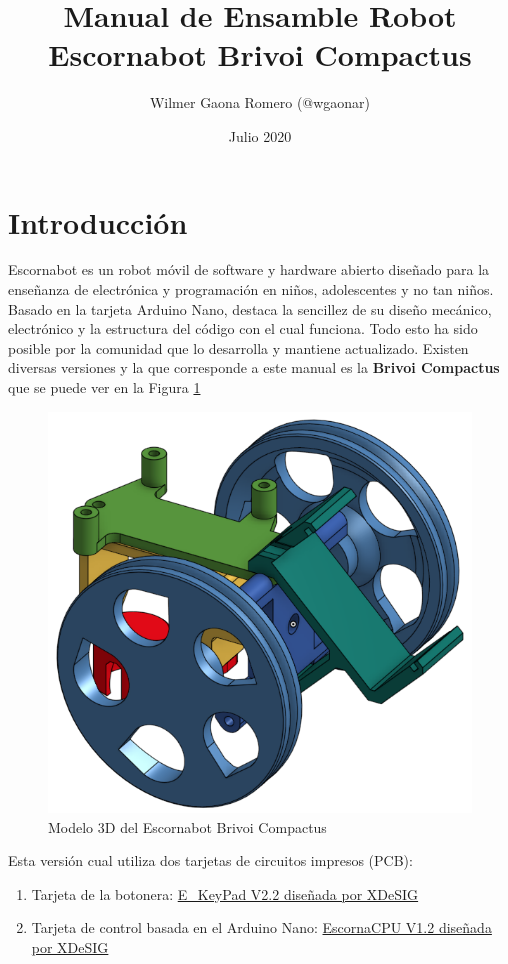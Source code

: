\documentclass{article}
\title{Manual de Ensamble Robot Escornabot Brivoi Compactus}
\author{Wilmer Gaona Romero (@wgaonar)}
\date{Julio 2020}
\begin{document}
\maketitle

\section{Introducción}
Escornabot es un robot móvil de software y hardware abierto diseñado para la enseñanza de electrónica y programación en niños, adolescentes y no tan niños. Basado en la tarjeta Arduino Nano, destaca la sencillez de su diseño mecánico, electrónico y la estructura del código con el cual funciona. Todo esto ha sido posible por la comunidad que lo desarrolla y mantiene actualizado. Existen diversas versiones y la que corresponde a este manual es la \textbf{Brivoi Compactus} que se puede ver en la Figura \ref{fig:modelo3D}

\begin{figure}[H]
    \centering
    \includegraphics[width=0.5\columnwidth]{images/3DParts/portadaOnshape.png}
    \caption{Modelo 3D del Escornabot Brivoi Compactus}
    \label{fig:modelo3D}
\end{figure}

Esta versión cual utiliza dos tarjetas de circuitos impresos (PCB):

\begin{enumerate}
    \item Tarjeta de la botonera: \href{https://github.com/xdesig/escornabot-electronics/tree/master/Electronics/E_KEYPAD/E_KEYPAD_2.20}{E\_KeyPad V2.2 diseñada por XDeSIG}
    \item Tarjeta de control basada en el Arduino Nano:
    \href{https://github.com/xdesig/escornabot-electronics/tree/master/Electronics/EscornaCPU/1.x/1.20}{EscornaCPU V1.2 diseñada por XDeSIG}
\end{enumerate}
\end{document}
